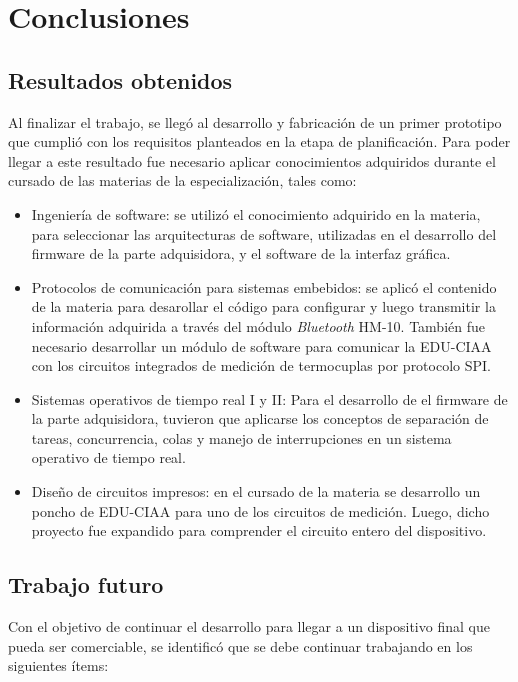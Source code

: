 \chapter{Conclusiones}

\label{Chapter5}

\section{Resultados obtenidos}

Al finalizar el trabajo, se llegó al desarrollo y fabricación de un primer prototipo que cumplió con los requisitos planteados en la etapa de planificación. Para poder llegar a este resultado fue necesario aplicar conocimientos adquiridos durante el cursado de las materias de la especialización, tales como:

\begin{itemize}
\item{Ingeniería de software:} se utilizó el conocimiento adquirido en la materia, para seleccionar las arquitecturas de software, utilizadas en el desarrollo del firmware de la parte adquisidora, y el software de la interfaz gráfica.

\item{Protocolos de comunicación para sistemas embebidos}: se aplicó el contenido de la materia para desarollar el código para configurar y luego transmitir la información adquirida a través del módulo \textit{Bluetooth} HM-10. También fue necesario desarrollar un módulo de software para comunicar la EDU-CIAA con los circuitos integrados de medición de termocuplas por protocolo SPI.

\item{Sistemas operativos de tiempo real I y II:} Para el desarrollo de el firmware de la parte adquisidora, tuvieron que aplicarse los conceptos de separación de tareas, concurrencia, colas y manejo de interrupciones en un sistema operativo de tiempo real.

\item{Diseño de circuitos impresos:} en el cursado de la materia se desarrollo un poncho de EDU-CIAA para uno de los circuitos de medición. Luego, dicho proyecto fue expandido para comprender el circuito entero del dispositivo.
\end{itemize}

\section{Trabajo futuro}
Con el objetivo de continuar el desarrollo para llegar a un dispositivo final que pueda ser comerciable, se identificó que se debe continuar trabajando en los siguientes ítems:

